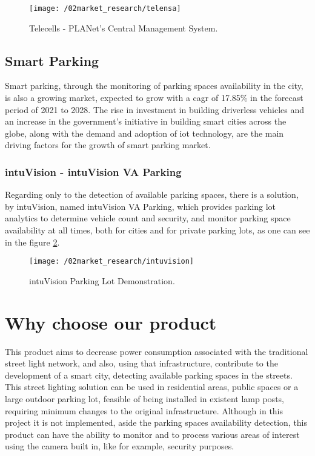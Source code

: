 \begin{figure}[ht]
	\centering
	\texttt{[image: /02market\_research/telensa]}
	\caption{Telecells - PLANet's Central Management System.}
	\label{fig:telensa}
\end{figure}

\subsection{Smart Parking}
Smart parking, through the monitoring of parking spaces availability in the city, is also a growing market, expected to grow with a \ac{cagr} of 17.85\% in the forecast period of 2021 to 2028.\cite{smart_parking_market} The rise in investment in building driverless vehicles and an increase in the government’s initiative in building smart cities across the globe, along with the demand and adoption of \ac{iot} technology, are the main driving factors for the growth of smart parking market.

\subsubsection{intuVision - intuVision VA Parking}
Regarding only to the detection of available parking spaces, there is a solution, by intuVision, named intuVision VA Parking, which provides parking lot analytics to determine vehicle count and security, and monitor parking space availability at all times, both for cities and for private parking lots, as one can see in the figure \ref{fig:intuvision}.\cite{parking}

\begin{figure}[ht]
	\centering
	\texttt{[image: /02market\_research/intuvision]}
	\caption{intuVision Parking Lot Demonstration.}
	\label{fig:intuvision}
\end{figure}

\clearpage
\section{Why choose our product}
This product aims to decrease power consumption associated with the traditional street light network, and also, using that infrastructure, contribute to the development of a smart city, detecting available parking spaces in the streets. This street lighting solution can be used in residential areas, public spaces or a large outdoor parking lot, feasible of being installed in existent lamp posts, requiring minimum changes to the original infrastructure. Although in this project it is not implemented, aside the parking spaces availability detection, this product can have the ability to monitor and to process various areas of interest using the camera built in, like for example, security purposes.
